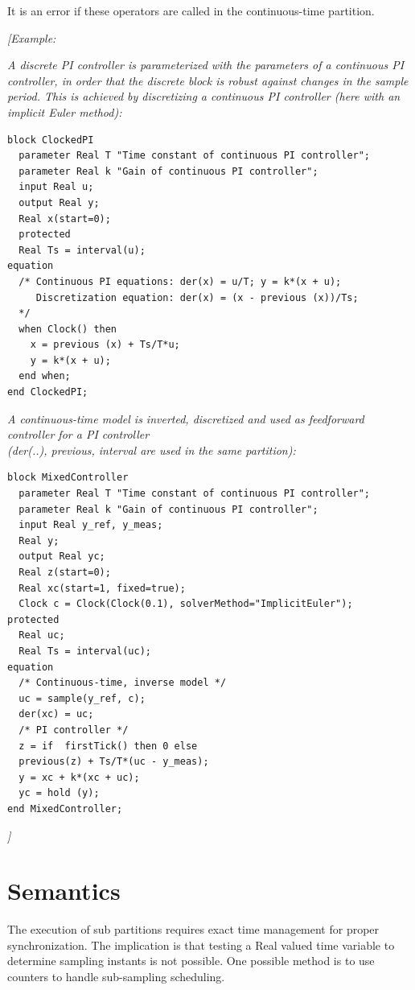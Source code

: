 \documentclass[10pt,a4paper]{report}
\def\doublelabel#1{\label{#1}}
\begin{document}
It is an error if these operators are called in the continuous-time
partition.

\emph{{[}Example:}

\emph{A discrete PI controller is parameterized with the parameters of a
continuous PI controller, in order that the discrete block is robust
against changes in the sample period. This is achieved by discretizing a
continuous PI controller (here with an implicit Euler method):}

\begin{lstlisting}[language=modelica]
block ClockedPI
  parameter Real T "Time constant of continuous PI controller";
  parameter Real k "Gain of continuous PI controller";
  input Real u;
  output Real y;
  Real x(start=0);
  protected
  Real Ts = interval(u);
equation
  /* Continuous PI equations: der(x) = u/T; y = k*(x + u);
     Discretization equation: der(x) = (x - previous (x))/Ts;
  */
  when Clock() then
    x = previous (x) + Ts/T*u;
    y = k*(x + u);
  end when;
end ClockedPI;
\end{lstlisting}
\emph{A continuous-time model is inverted, discretized and used as
feedforward controller for a PI controller\\
(der(..), previous, interval are used in the same partition):}

\begin{lstlisting}[language=modelica]
block MixedController
  parameter Real T "Time constant of continuous PI controller";
  parameter Real k "Gain of continuous PI controller";
  input Real y_ref, y_meas;
  Real y;
  output Real yc;
  Real z(start=0);
  Real xc(start=1, fixed=true);
  Clock c = Clock(Clock(0.1), solverMethod="ImplicitEuler");
protected
  Real uc;
  Real Ts = interval(uc);
equation
  /* Continuous-time, inverse model */
  uc = sample(y_ref, c);
  der(xc) = uc;
  /* PI controller */
  z = if  firstTick() then 0 else
  previous(z) + Ts/T*(uc - y_meas);
  y = xc + k*(xc + uc);
  yc = hold (y);
end MixedController;
\end{lstlisting}
\emph{{]}}

\section{Semantics}\doublelabel{semantics}

The execution of sub partitions requires exact time management for
proper synchronization. The implication is that testing a Real valued
time variable to determine sampling instants is not possible. One
possible method is to use counters to handle sub-sampling scheduling.
\end{document}
